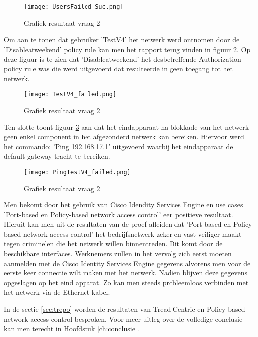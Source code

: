 \begin{figure}[H]
	\centering
	\texttt{[image: UsersFailed\_Suc.png]}
	\caption{Grafiek resultaat vraag 2}
	\label{fig:failed}
\end{figure}

Om aan te tonen dat gebruiker 'TestV4' het netwerk werd ontnomen door de 'Disable\textunderscore at\textunderscore weekend' policy rule kan men het rapport terug vinden in figuur \ref{fig:failed2}. Op deze figuur is te zien dat 'Disable\textunderscore at\textunderscore weekend' het desbetreffende Authorization policy rule was die werd uitgevoerd dat resulteerde in geen toegang tot het netwerk. 

\begin{figure}[H]
	\centering
	\texttt{[image: TestV4\_failed.png]}
	\caption{Grafiek resultaat vraag 2}
	\label{fig:failed2}
\end{figure}

Ten slotte toont figuur \ref{fig:ping} aan dat het eindapparaat na blokkade van het netwerk geen enkel component in het afgezonderd netwerk kan bereiken. Hiervoor werd het commando: 'Ping 192.168.17.1' uitgevoerd waarbij het eindapparaat de default gateway tracht te bereiken.

\begin{figure}[H]
	\centering
	\texttt{[image: PingTestV4\_failed.png]}
	\caption{Grafiek resultaat vraag 2}
	\label{fig:ping}
\end{figure}


Men bekomt door het gebruik van Cisco Idendity Services Engine en use cases 'Port-based en Policy-based network access control' een positieve resultaat. Hieruit kan men uit de resultaten van de proef afleiden dat 'Port-based en Policy-based network access control' het bedrijfsnetwerk zeker en vast veiliger maakt tegen criminelen die het netwerk willen binnentreden. Dit komt door de beschikbare interfaces. Werknemers zullen in het vervolg zich eerst moeten aanmelden met de Cisco Identity Services Engine gegevens alvorens men voor de eerste keer connectie wilt maken met het netwerk. Nadien blijven deze gegevens opgeslagen op het eind apparat. Zo kan men steeds probleemloos verbinden met het netwerk via de Ethernet kabel.

In de sectie \ref{sec:trepo} worden de resultaten van Tread-Centric en Policy-based network access control besproken. Voor meer uitleg over de volledige conclusie kan men terecht in Hoofdstuk \ref{ch:conclusie}.


